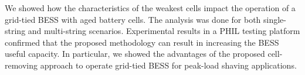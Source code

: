 \documentclass[10pt,twocolumn]{IEEEtran}
\begin{document}
We showed how the  characteristics of the weakest cells impact the operation of a grid-tied BESS with aged battery cells. 
The analysis was done for both single-string and multi-string scenarios.
 Experimental results in a PHIL testing platform confirmed that the proposed methodology can result in increasing the BESS useful capacity. 
In particular, we showed the advantages of the proposed cell-removing approach to operate grid-tied BESS for peak-load shaving applications. 










\vspace{-0.3cm}






\end{document}
